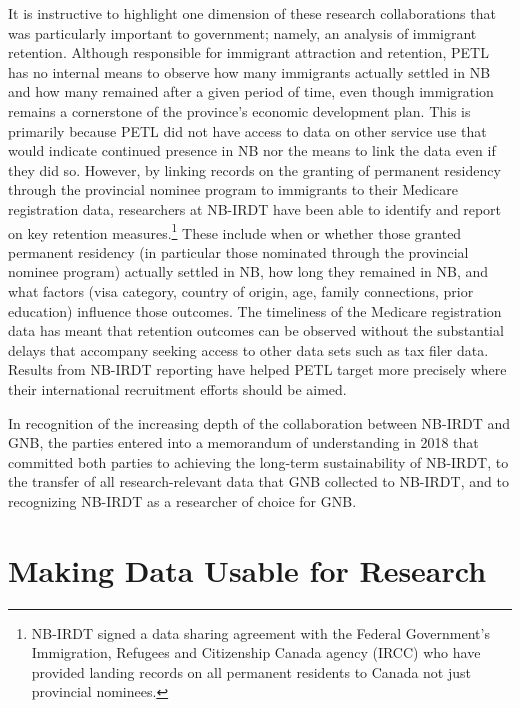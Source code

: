 \documentclass[
]{book}
\begin{document}
It is instructive to highlight one dimension of these research collaborations that was particularly important to government; namely, an analysis of immigrant retention. Although responsible for immigrant attraction and retention, PETL has no internal means to observe how many immigrants actually settled in NB and how many remained after a given period of time, even though immigration remains a cornerstone of the province's economic development plan. This is primarily because PETL did not have access to data on other service use that would indicate continued presence in NB nor the means to link the data even if they did so. However, by linking records on the granting of permanent residency through the provincial nominee program to immigrants to their Medicare registration data, researchers at NB-IRDT have been able to identify and report on key retention measures.\footnote{NB-IRDT signed a data sharing agreement with the Federal Government's Immigration, Refugees and Citizenship Canada agency (IRCC) who have provided landing records on all permanent residents to Canada not just provincial nominees.} These include when or whether those granted permanent residency (in particular those nominated through the provincial nominee program) actually settled in NB, how long they remained in NB, and what factors (visa category, country of origin, age, family connections, prior education) influence those outcomes. The timeliness of the Medicare registration data has meant that retention outcomes can be observed without the substantial delays that accompany seeking access to other data sets such as tax filer data. Results from NB-IRDT reporting have helped PETL target more precisely where their international recruitment efforts should be aimed.

In recognition of the increasing depth of the collaboration between NB-IRDT and GNB, the parties entered into a memorandum of understanding in 2018 that committed both parties to achieving the long-term sustainability of NB-IRDT, to the transfer of all research-relevant data that GNB collected to NB-IRDT, and to recognizing NB-IRDT as a researcher of choice for GNB.

\hypertarget{making-data-usable-for-research-2}{%
\section{Making Data Usable for Research}\label{making-data-usable-for-research-2}}
\end{document}
